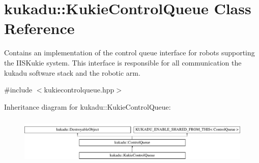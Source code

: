 \hypertarget{classkukadu_1_1KukieControlQueue}{\section{kukadu\-:\-:Kukie\-Control\-Queue Class Reference}
\label{classkukadu_1_1KukieControlQueue}
}


Contains an implementation of the control queue interface for robots supporting the I\-I\-S\-Kukie system. This interface is responsible for all communication the kukadu software stack and the robotic arm.  




{\ttfamily \#include $<$kukiecontrolqueue.\-hpp$>$}

Inheritance diagram for kukadu\-:\-:Kukie\-Control\-Queue\-:\begin{figure}[H]
\begin{center}
\leavevmode
\includegraphics[height=2.301370cm]{classkukadu_1_1KukieControlQueue}
\end{center}
\end{figure}
